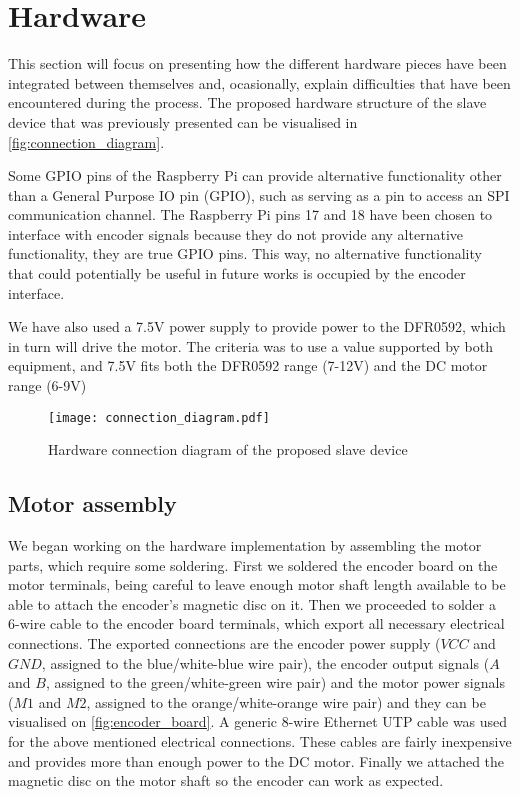 \section{Hardware} \label{sec:hardware-devel}
This section will focus on presenting how the different hardware pieces have been integrated between themselves and, ocasionally, explain difficulties that have been encountered during the process.
The proposed hardware structure of the slave device that was previously presented can be visualised in \autoref{fig:connection_diagram}.

Some GPIO pins of the Raspberry Pi can provide alternative functionality other than a General Purpose IO pin (GPIO), such as serving as a pin to access an SPI communication channel.
The Raspberry Pi pins 17 and 18 have been chosen to interface with encoder signals because they do not provide any alternative functionality, they are true GPIO pins.
This way, no alternative functionality that could potentially be useful in future works is occupied by the encoder interface.

We have also used a 7.5V power supply to provide power to the DFR0592, which in turn will drive the motor.
The criteria was to use a value supported by both equipment, and 7.5V fits both the DFR0592 range (7-12V) and the DC motor range (6-9V)

\begin{figure}[htp]
	\centering
	\texttt{[image: connection\_diagram.pdf]}
	\caption{Hardware connection diagram of the proposed slave device}
	\label{fig:connection_diagram}
\end{figure}

\subsection{Motor assembly}
We began working on the hardware implementation by assembling the motor parts, which require some soldering.
First we soldered the encoder board on the motor terminals, being careful to leave enough motor shaft length available to be able to attach the encoder's magnetic disc on it.
Then we proceeded to solder a 6-wire cable to the encoder board terminals, which export all necessary electrical connections.
The exported connections are the encoder power supply ($VCC$ and $GND$, assigned to the blue/white-blue wire pair), the encoder output signals ($A$ and $B$, assigned to the green/white-green wire pair) and the motor power signals ($M1$ and $M2$, assigned to the orange/white-orange wire pair) and they can be visualised on \autoref{fig:encoder_board}.
A generic 8-wire Ethernet UTP cable was used for the above mentioned electrical connections.
These cables are fairly inexpensive and provides more than enough power to the DC motor.
Finally we attached the magnetic disc on the motor shaft so the encoder can work as expected.

